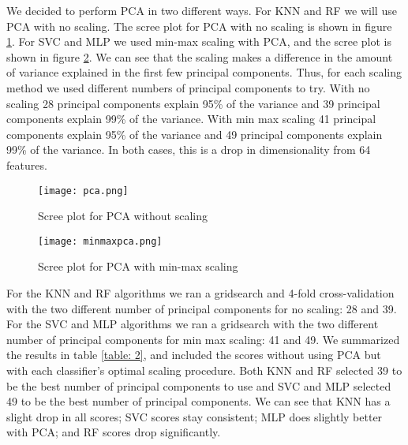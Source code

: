 \documentclass[12pt]{article}
\begin{document}
We decided to perform PCA in two different ways. For KNN and RF we will use PCA with no scaling. The scree plot for PCA with no scaling is shown in figure \ref{scree1}. For SVC and MLP we used min-max scaling with PCA, and the scree plot is shown in figure \ref{scree2}. We can see that the scaling makes a difference in the amount of variance explained in the first few principal components. Thus, for each scaling method we used different numbers of principal components to try. With no scaling 28 principal components explain 95\% of the variance and 39 principal components explain 99\% of the variance. With min max scaling 41 principal components explain 95\% of the variance and 49 principal components explain 99\% of the variance. In both cases, this is a drop in dimensionality from 64 features.

\begin{figure}[h]
	\centering
	\texttt{[image: pca.png]}
	\caption{Scree plot for PCA without scaling}
	\label{scree1}
\end{figure}

\begin{figure}[h]
	\centering
	\texttt{[image: minmaxpca.png]}
	\caption{Scree plot for PCA with min-max scaling}
	\label{scree2}
\end{figure}

For the KNN and RF algorithms we ran a gridsearch and 4-fold cross-validation with the two different number of principal components for no scaling: 28 and 39. For the SVC and MLP algorithms we ran a gridsearch with the two different number of principal components for min max scaling: 41 and 49. We summarized the results in table \ref{table: 2}, and included the scores without using PCA but with each classifier's optimal scaling procedure. Both KNN and RF selected 39 to be the best number of principal components to use and SVC and MLP selected 49 to be the best number of principal components. We can see that KNN has a slight drop in all scores; SVC scores stay consistent; MLP does slightly better with PCA; and RF scores drop significantly.
 
\end{document}
